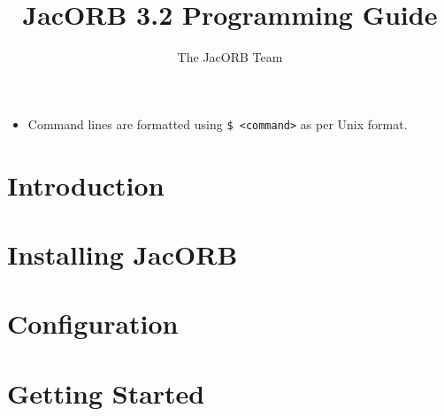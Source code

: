 \documentclass[12pt]{scrbook}
\title{JacORB 3.2 Programming Guide}
\author{The JacORB Team}
\begin{document}
\newcommand{\cmdline}[1]{\begin{small}\noindent \texttt{\$ #1}\end{small}}

\newcommand{\JacORBDir}{jacorb-3\_2}
\newcommand{\JacORBVersion}{3.2}
\maketitle

\setlength{\parskip}{1.1ex}
\newpage
\tableofcontents

\label{FormatStyle}
\begin{itemize}
\item Command lines are formatted using {\tt \$ <command>} as per Unix format.
\end{itemize}


\chapter{Introduction}
\label{ch:intro}




\chapter{Installing JacORB}
\label{ch:installing}




\chapter{Configuration}
\label{ch:configuration}




\chapter{Getting Started}
\label{ch:start}
\end{document}
